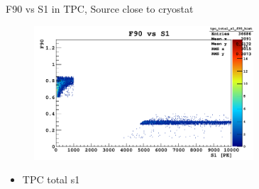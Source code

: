 \documentclass[9pt]{beamer}
\begin{document}

\begin{frame}{F90 vs S1 in TPC, Source close to cryostat}
\begin{figure}
\includegraphics[height= 5cm, width=.8\textwidth]{f90_tpc_total_s1_Feb7PM.png}
\end{figure}
\begin{itemize}
[bullet]
\item TPC total s1
\end{itemize}
\end{frame}
\end{document}
